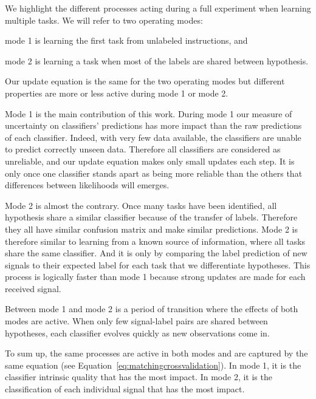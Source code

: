 We highlight the different processes acting during a full experiment when learning multiple tasks. We will refer to two operating modes: \begin{inparaenum}[a)] \item mode 1 is learning the first task from unlabeled instructions, and \item mode 2 is learning a task when most of the labels are shared between hypothesis. \end{inparaenum} Our update equation is the same for the two operating modes but different properties are more or less active during mode 1 or mode 2.

Mode 1 is the main contribution of this work. During mode 1 our measure of uncertainty on classifiers' predictions has more impact than the raw predictions of each classifier. Indeed, with very few data available, the classifiers are unable to predict correctly unseen data. Therefore all classifiers are considered as unreliable, and our update equation makes only small updates each step. It is only once one classifier stands apart as being more reliable than the others that differences between likelihoods will emerges. 

Mode 2 is almost the contrary. Once many tasks have been identified, all hypothesis share a similar classifier because of the transfer of labels. Therefore they all have similar confusion matrix and make similar predictions. Mode 2 is therefore similar to learning from a known source of information, where all tasks share the same classifier. And it is only by comparing the label prediction of new signals to their expected label for each task that we differentiate hypotheses. This process is logically faster than mode 1 because strong updates are made for each received signal.

Between mode 1 and mode 2 is a period of transition where the effects of both modes are active. When only few signal-label pairs are shared between hypotheses, each classifier evolves quickly as new observations come in. 

To sum up, the same processes are active in both modes and are captured by the same equation (see Equation~\ref{eq:matchingcrossvalidation}). In mode 1, it is the classifier intrinsic quality that has the most impact. In mode 2, it is the classification of each individual signal that has the most impact. 

